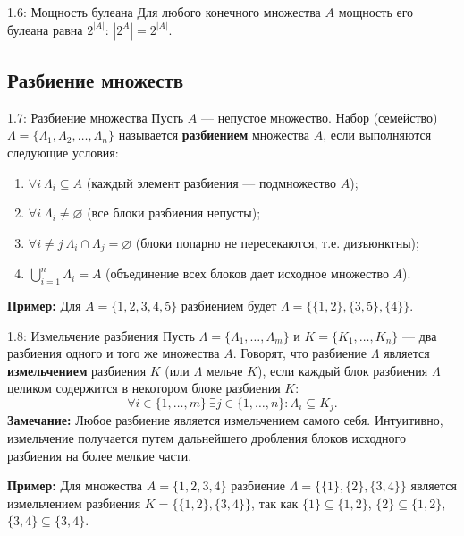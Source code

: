 \documentclass[a4paper,12pt]{article}
\begin{document}
\begin{theorembox}{1.6: Мощность булеана}
	Для любого конечного множества $A$ мощность его булеана равна $2^{|A|}$: $|2^A| = 2^{|A|}$.
\end{theorembox}

\subsection{Разбиение множеств}

\begin{definitionbox}{1.7: Разбиение множества}
	Пусть $A$ — непустое множество. Набор (семейство) $\Lambda = \{\Lambda_1, \Lambda_2, \dots, \Lambda_n\}$ называется \textbf{разбиением} множества $A$, если выполняются следующие условия:
	\begin{enumerate}
		\item $\forall i \ \Lambda_i \subseteq A$ (каждый элемент разбиения — подмножество $A$);
		\item $\forall i\ \Lambda_i \neq \varnothing$ (все блоки разбиения непусты);
		\item $\forall i \neq j\ \Lambda_i \cap \Lambda_j = \varnothing$ (блоки попарно не пересекаются, т.е. дизъюнктны);
		\item $\bigcup_{i=1}^n \Lambda_i = A$ (объединение всех блоков дает исходное множество $A$).
	\end{enumerate}
\end{definitionbox}

\noindent \textbf{Пример:} Для $A = \{1,2,3,4,5\}$ разбиением будет $\Lambda = \{\{1,2\}, \{3,5\}, \{4\}\}$.

\begin{definitionbox}{1.8: Измельчение разбиения}
	Пусть $\Lambda = \{\Lambda_1, \dots, \Lambda_m\}$ и $K = \{K_1, \dots, K_n\}$ — два разбиения одного и того же множества $A$.
	Говорят, что разбиение $\Lambda$ является \textbf{измельчением} разбиения $K$ (или $\Lambda$ мельче $K$), если каждый блок разбиения $\Lambda$ целиком содержится в некотором блоке разбиения $K$:
	\[
	\forall i \in \{1,\dots,m\}\ \exists j \in \{1,\dots,n\} : \Lambda_i \subseteq K_j.
	\]
	\textbf{Замечание:} Любое разбиение является измельчением самого себя. Интуитивно, измельчение получается путем дальнейшего дробления блоков исходного разбиения на более мелкие части.
\end{definitionbox}

\noindent \textbf{Пример:} Для множества $A = \{1,2,3,4\}$ разбиение $\Lambda = \{\{1\}, \{2\}, \{3,4\}\}$ является измельчением разбиения $K = \{\{1,2\}, \{3,4\}\}$, так как $\{1\} \subseteq \{1,2\}$, $\{2\} \subseteq \{1,2\}$, $\{3,4\} \subseteq \{3,4\}$.
\end{document}
